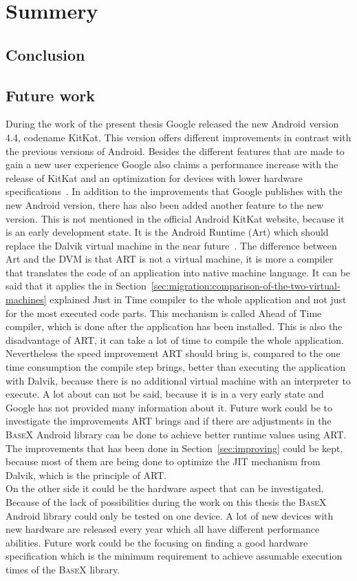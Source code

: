 \chapter{Summery}
\label{cha:summery}
\section{Conclusion}
\label{sec:summery:conclusion}
\section{Future work}
\label{sec:summery:future-work}
During the work of the present thesis Google released the new Android version 4.4, codename KitKat.
This version offers different improvements in contrast with the previous versions of Android.
Besides the different features that are made to gain a new user experience Google also claims a performance increase with the release of KitKat and an optimization for devices with lower hardware specifications~\cite{google-kitkat}.
In addition to the improvements that Google publishes with the new Android version, there has also been added another feature to the new version.
This is not mentioned in the official Android KitKat website, because it is an early development state.
It is the Android Runtime (Art) which should replace the Dalvik virtual machine in the near future~\cite{android-art}.
The difference between Art and the DVM is that ART is not a virtual machine, it is more a compiler that translates the code of an application into native machine language.
It can be said that it applies the in Section~\ref{sec:migration:comparison-of-the-two-virtual-machines} explained Just in Time compiler to the whole application and not just for the most executed code parts.
This mechanism is called Ahead of Time compiler, which is done after the application has been installed.
This is also the disadvantage of ART, it can take a lot of time to compile the whole application.
Nevertheless the speed improvement ART should bring is, compared to the one time consumption the compile step brings, better than executing the application with Dalvik, because there is no additional virtual machine with an interpreter to execute.
A lot about can not be said, because it is in a very early state and Google has not provided many information about it.
Future work could be to investigate the improvements ART brings and if there are adjustments in the \textsc{BaseX} Android library can be done to achieve better runtime values using ART.
The improvements that has been done in Section~\ref{sec:improving} could be kept, because most of them are being done to optimize the JIT mechanism from Dalvik, which is the principle of ART.\\
On the other side it could be the hardware aspect that can be investigated.
Because of the lack of possibilities during the work on this thesis the \textsc{BaseX} Android library could only be tested on one device.
A lot of new devices with new hardware are released every year which all have different performance abilities.
Future work could be the focusing on finding a good hardware specification which is the minimum requirement to achieve assumable execution times of the \textsc{BaseX} library.
